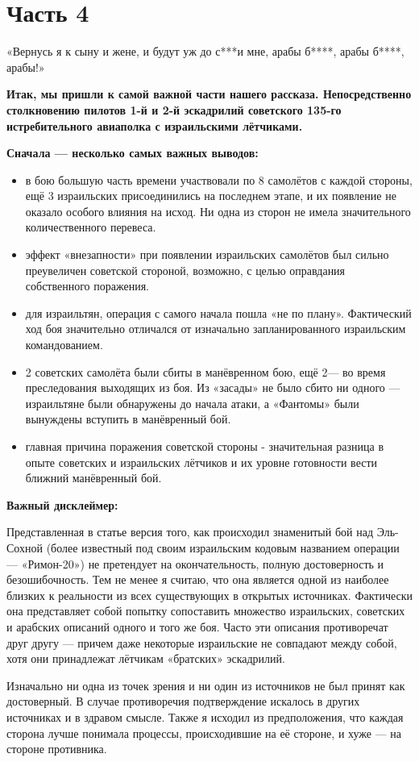 \chapter{Часть 4}

\begin{textcitation}
	«Вернусь я к сыну и жене,
	и будут уж до с***и мне,
	арабы б****, арабы б****, арабы!»
\end{textcitation}

\textbf{Итак, мы пришли к самой важной части нашего рассказа. Непосредственно столкновению пилотов 1-й и 2-й эскадрилий советского 135-го истребительного авиаполка с израильскими лётчиками.}

{ \textbf{Сначала — несколько самых важных выводов:}
	\begin{itemize}
		\item в бою большую часть времени участвовали по 8 самолётов с каждой стороны, ещё 3 израильских присоединились на последнем этапе, и их появление не оказало особого влияния на исход. Ни одна из сторон не имела значительного количественного перевеса.
		\item эффект «внезапности» при появлении израильских самолётов был сильно преувеличен советской стороной, возможно, с целью оправдания собственного поражения.
		\item для израильтян, операция с самого начала пошла «не по плану». Фактический ход боя значительно отличался от изначально запланированного израильским командованием.
		\item 2 советских самолёта были сбиты в манёвренном бою, ещё 2— во время преследования выходящих из боя. Из «засады» не было сбито ни одного — израильтяне были обнаружены до начала атаки, а «Фантомы» были вынуждены вступить в манёвренный бой.
		
		\item главная причина поражения советской стороны - значительная разница в опыте советских и израильских лётчиков и их уровне готовности вести ближний манёвренный бой.
	\end{itemize}
\itshape}
\begin{remark}
	\textbf{Важный дисклеймер:}
	
	Представленная в статье версия того, как происходил знаменитый бой над Эль-Сохной (более известный под своим израильским кодовым названием операции — «Римон-20») не претендует на окончательность, полную достоверность и безошибочность. Тем не менее я считаю, что она является одной из наиболее близких к реальности из всех существующих в открытых источниках. Фактически она представляет собой попытку сопоставить множество израильских, советских и арабских описаний одного и того же боя. Часто эти описания противоречат друг другу — причем даже некоторые израильские не совпадают между собой, хотя они принадлежат лётчикам «братских» эскадрилий.
	
	Изначально ни одна из точек зрения и ни один из источников не был принят как достоверный. В случае противоречия подтверждение искалось в других источниках и в здравом смысле. Также я исходил из предположения, что каждая сторона лучше понимала процессы, происходившие на её стороне, и хуже — на стороне противника.
\end{remark}

